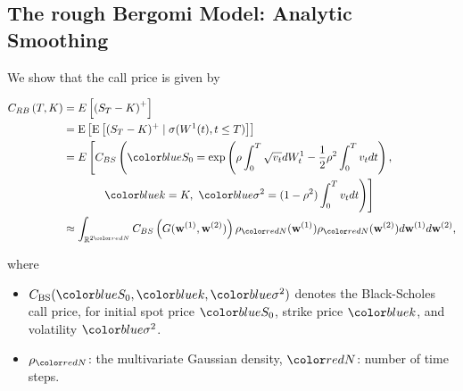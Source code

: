 \documentclass[ima, 20pt, portrait, plainboxedsections]{sciposter}
\begin{document}
\begin{multicols}{3}
\section*{The rough Bergomi Model: Analytic Smoothing}
We show that the call price is given by
%
\begin{small}
\begin{align}
C_{RB}\left( T, K \right) &= E\left[ \left(S_T - K \right)^+ \right]  \nonumber\\
&=\expt{\expt{(S_T-K)^+ \mid \sigma(W^1(t) ,t \le T)}}\nonumber \\
&=E\left[C_{BS}\left( \blue{S_0} = \operatorname{exp}\left(\rho \int_0^T \sqrt{v_t} dW_t^1 - \frac{1}{2}
\rho^2 \int_0^T v_t dt\right), \right. \right.\nonumber\\
&\quad \quad \quad \left.\left.\ \blue{k} = K , \ \blue{\sigma^2} = (1-\rho^2)
\int_0^T v_t dt \right) \right]\nonumber\\
&\approx \int_{\rset^{2\red{N}}} C_{BS} \left(G(\mathbf{w}^{(1)},\mathbf{w}^{(2)})\right) \rho_{\red{N}}(\mathbf{w}^{(1)})  \rho_{\red{N}}(\mathbf{w}^{(2)}) d\mathbf{w}^{(1)} d\mathbf{w}^{(2)} \COMMA
\end{align}
\end{small}
where 
\begin{itemize}
\item $C_{\text{BS}}(\blue{S_0},\blue{k},\blue{\sigma^2})$ denotes the Black-Scholes call price, for initial spot price $\blue{S_0}$, strike price $\blue{k}$, and volatility $\blue{\sigma^2}$.
\item $\rho_{\red{N}}$: the multivariate Gaussian density, $\red{N}$: number of time steps.
\end{itemize} 
%
%

\end{multicols}
\end{document}

